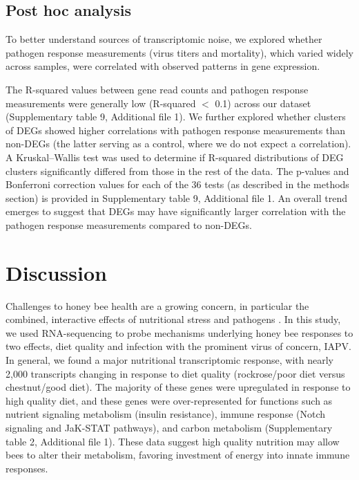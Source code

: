 \documentclass{bmcart}
\begin{document}
\begin{linenumbers}
\begin{doublespacing}
\subsection*{Post hoc analysis}

To better understand sources of transcriptomic noise, we explored whether pathogen response measurements (virus titers and mortality), which varied widely across samples, were correlated with observed patterns in gene expression. 

The R-squared values between gene read counts and pathogen response measurements were generally low (R-squared $<$ 0.1) across our dataset (Supplementary table 9, Additional file 1). We further explored whether clusters of DEGs showed higher correlations with pathogen response measurements than non-DEGs (the latter serving as a control, where we do not expect a correlation). A Kruskal–Wallis test was used to determine if R-squared distributions of DEG clusters significantly differed from those in the rest of the data. The p-values and Bonferroni correction values for each of the 36 tests (as described in the methods section) is provided in Supplementary table 9, Additional file 1. An overall trend emerges to suggest that DEGs may have significantly larger correlation with the pathogen response measurements compared to non-DEGs.

\section*{Discussion}

Challenges to honey bee health are a growing concern, in particular the combined, interactive effects of nutritional stress and pathogens \cite{AdamTothReview}. In this study, we used RNA-sequencing to probe mechanisms underlying honey bee responses to two effects, diet quality and infection with the prominent virus of concern, IAPV. In general, we found a major nutritional transcriptomic response, with nearly 2,000 transcripts changing in response to diet quality (rockrose/poor diet versus chestnut/good diet). The majority of these genes were upregulated in response to high quality diet, and these genes were over-represented for functions such as nutrient signaling metabolism (insulin resistance), immune response (Notch signaling and JaK-STAT pathways), and carbon metabolism (Supplementary table 2, Additional file 1). These data suggest high quality nutrition may allow bees to alter their metabolism, favoring investment of energy into innate immune responses.


\end{doublespacing}
\end{linenumbers}
\end{document}
